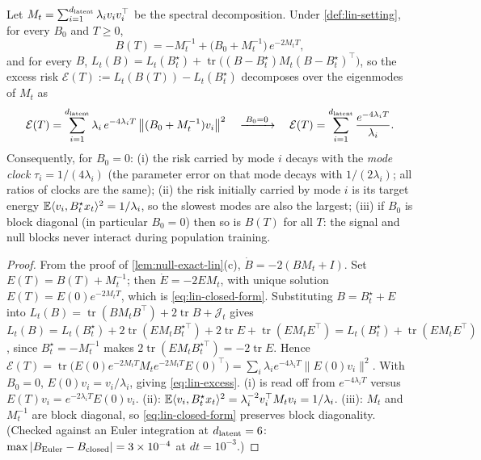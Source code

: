 \begin{proposition}\label{prop:lin-gf-closed}
Let $M_t=\sum_{i=1}^{d_{\mathrm{latent}}}\lambda_iv_iv_i^{\top}$ be the spectral decomposition. Under \cref{def:lin-setting}, for every $B_0$ and $T\ge0$,
\begin{equation}\label{eq:lin-closed-form}
B(T)=-M_t^{-1}+\big(B_0+M_t^{-1}\big)\,e^{-2M_tT},
\end{equation}
and for every $B$, $L_t(B)=L_t(B^\star_t)+\operatorname{tr}\big((B-B^\star_t)M_t(B-B^\star_t)^{\top}\big)$, so the excess risk $\mathcal E(T):=L_t(B(T))-L_t(B^\star_t)$ decomposes over the eigenmodes of $M_t$ as
\begin{equation}\label{eq:lin-excess}
\mathcal E(T)=\sum_{i=1}^{d_{\mathrm{latent}}}\lambda_i\,e^{-4\lambda_iT}\,\big\|(B_0+M_t^{-1})v_i\big\|^2\quad\xrightarrow{\;B_0=0\;}\quad \mathcal E(T)=\sum_{i=1}^{d_{\mathrm{latent}}}\frac{e^{-4\lambda_iT}}{\lambda_i}.
\end{equation}
Consequently, for $B_0=0$: (i) the risk carried by mode $i$ decays with the \emph{mode clock} $\tau_i=1/(4\lambda_i)$ (the parameter error on that mode decays with $1/(2\lambda_i)$; all ratios of clocks are the same); (ii) the risk initially carried by mode $i$ is its target energy $\mathbb{E}\langle v_i,B^\star_tx_t\rangle^2=1/\lambda_i$, so the slowest modes are also the largest; (iii) if $B_0$ is block diagonal (in particular $B_0=0$) then so is $B(T)$ for all $T$: the signal and null blocks never interact during population training.
\end{proposition}
\begin{proof}
From the proof of \cref{lem:null-exact-lin}(c), $\dot B=-2(BM_t+I)$. Set $E(T)=B(T)+M_t^{-1}$; then $\dot E=-2EM_t$, with unique solution $E(T)=E(0)e^{-2M_tT}$, which is \eqref{eq:lin-closed-form}. Substituting $B=B^\star_t+E$ into $L_t(B)=\operatorname{tr}(BM_tB^{\top})+2\operatorname{tr}B+\mathcal J_t$ gives $L_t(B)=L_t(B^\star_t)+2\operatorname{tr}(EM_tB^{\star\top}_t)+2\operatorname{tr}E+\operatorname{tr}(EM_tE^{\top})=L_t(B^\star_t)+\operatorname{tr}(EM_tE^{\top})$, since $B^\star_t=-M_t^{-1}$ makes $2\operatorname{tr}(EM_tB^{\star\top}_t)=-2\operatorname{tr}E$. Hence $\mathcal E(T)=\operatorname{tr}\big(E(0)e^{-2M_tT}M_te^{-2M_tT}E(0)^{\top}\big)=\sum_i\lambda_ie^{-4\lambda_iT}\|E(0)v_i\|^2$. With $B_0=0$, $E(0)v_i=v_i/\lambda_i$, giving \eqref{eq:lin-excess}. (i) is read off from $e^{-4\lambda_iT}$ versus $E(T)v_i=e^{-2\lambda_iT}E(0)v_i$. (ii): $\mathbb{E}\langle v_i,B^\star_tx_t\rangle^2=\lambda_i^{-2}v_i^{\top}M_tv_i=1/\lambda_i$. (iii): $M_t$ and $M_t^{-1}$ are block diagonal, so \eqref{eq:lin-closed-form} preserves block diagonality. (Checked against an Euler integration at $d_{\mathrm{latent}}=6$: $\max|B_{\rm Euler}-B_{\rm closed}|=3\times10^{-4}$ at $dt=10^{-3}$.)
\end{proof}

